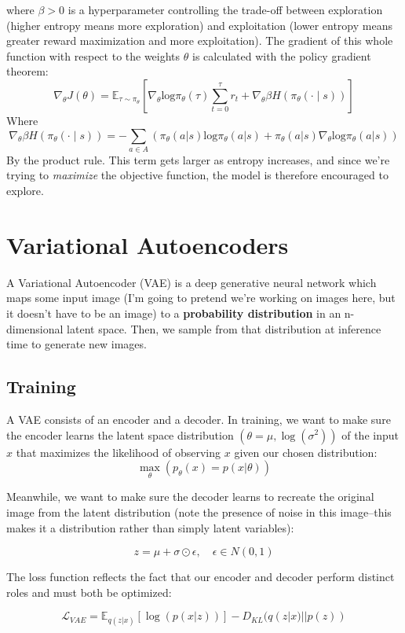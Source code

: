 \documentclass[12pt]{article}
\begin{document}
where \(\beta > 0\) is a hyperparameter controlling the trade-off between exploration (higher entropy means more exploration) and exploitation (lower entropy means greater reward maximization and more exploitation). The gradient of this whole function with respect to the weights \(\theta\) is calculated with the policy gradient theorem:
\[\nabla_\theta J(\theta) = \mathbb{E}_{\tau \sim \pi_\theta}\left[\nabla_\theta \text{log}\pi_\theta (\tau)\sum_{t=0}^\tau  r_t + \nabla_\theta \beta H(\pi_\theta(\cdot \mid s))\right]\]
Where
\[ \nabla_\theta \beta H(\pi_\theta(\cdot \mid s)) = -\sum_{a \in A} (\pi_\theta(a|s)\text{log}\pi_\theta(a|s) + \pi_\theta(a|s)\nabla_\theta \text{log} \pi_\theta (a|s))\]
By the product rule. This term gets larger as entropy increases, and since we're trying to \emph{maximize} the objective function, the model is therefore encouraged to explore. 
\section{Variational Autoencoders}
A Variational Autoencoder (VAE) is a deep generative neural network which maps some input image (I'm going to pretend we're working on images here, but it doesn't have to be an image) to a \textbf{probability distribution}  in an n-dimensional latent space. Then, we sample from that distribution at inference time to generate new images.\\
\subsection{Training}
A VAE consists of an encoder and a decoder. In training, we want to make sure the encoder learns the latent space distribution \((\theta = \mu, \log(\sigma^2))\) of the input \(x\) that maximizes the likelihood of observing \(x\) given our chosen distribution:
\[\max_\theta(p_\theta(x) = p(x | \theta))\]

Meanwhile, we want to make sure the decoder learns to recreate the original image from the latent distribution (note the presence of noise in this image--this makes it a distribution rather than simply latent variables):

\[z = \mu + \sigma \odot \epsilon, \quad \epsilon \in N(0,1)\]

The loss function reflects the fact that our encoder and decoder perform distinct roles and must both be optimized:

\[\mathcal{L}_{VAE}= \mathbb{E}_{q(z|x)}[\log(p(x|z))] - D_{KL}(q(z|x)||p(z))\]
\end{document}
